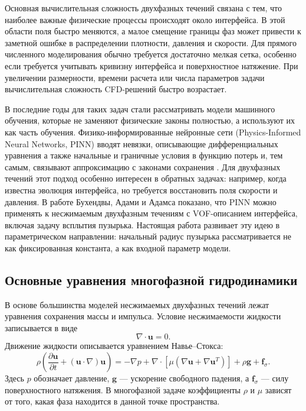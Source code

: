 \documentclass[12pt,a4paper]{article}
\begin{document}
Основная вычислительная сложность двухфазных течений связана с тем, что
наиболее важные физические процессы происходят около интерфейса. В этой области
поля быстро меняются, а малое смещение границы фаз может привести к заметной
ошибке в распределении плотности, давления и скорости. Для прямого численного
моделирования обычно требуется достаточно мелкая сетка, особенно если требуется
учитывать кривизну интерфейса и поверхностное натяжение. При увеличении
размерности, времени расчета или числа параметров задачи вычислительная сложность CFD-решений
быстро возрастает.

В последние годы для таких задач стали рассматривать модели машинного обучения,
которые не заменяют физические законы полностью, а используют их как часть
обучения. Физико-информированные нейронные сети (Physics-Informed Neural
Networks, PINN) вводят невязки, описывающие дифференциальных уравнения а также начальные и граничные условия в функцию потерь и,
тем самым, связывают аппроксимацию с законами сохранения \cite{Raissi2019}.
Для двухфазных течений этот подход особенно интересен в обратных задачах:
например, когда известна эволюция интерфейса, но требуется восстановить поля
скорости и давления. В работе Бухендвы, Адами и Адамса \cite{Buhendwa2021}
показано, что PINN можно применять к несжимаемым двухфазным течениям с
VOF-описанием интерфейса, включая задачу всплытия пузырька. Настоящая работа
развивает эту идею в параметрическом направлении: начальный радиус пузырька
рассматривается не как фиксированная константа, а как входной
параметр модели.

\subsection{Основные уравнения многофазной гидродинамики}

В основе большинства моделей несжимаемых двухфазных течений лежат уравнения
сохранения массы и импульса. Условие несжимаемости жидкости записывается в виде
\begin{equation}
    \nabla\cdot\mathbf{u}=0.
    \label{eq:review_incompressibility}
\end{equation}
Движение жидкости описывается уравнением Навье--Стокса:
\begin{equation}
    \rho
    \left(
        \frac{\partial\mathbf{u}}{\partial t}
        +(\mathbf{u}\cdot\nabla)\mathbf{u}
    \right)
    =
    -\nabla p
    +\nabla\cdot
    \left[
        \mu
        \left(\nabla\mathbf{u}+\nabla\mathbf{u}^{T}\right)
    \right]
    +\rho\mathbf{g}
    +\mathbf{f}_{\sigma}.
    \label{eq:review_momentum}
\end{equation}
Здесь \(p\) обозначает давление, \(\mathbf{g}\) --- ускорение свободного
падения, а \(\mathbf{f}_{\sigma}\) --- силу поверхностного натяжения. В
многофазной задаче коэффициенты \(\rho\) и \(\mu\) зависят от того, какая фаза
находится в данной точке пространства.
\end{document}
